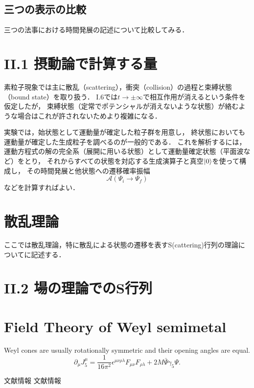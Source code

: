 \documentclass[uplatex]{jsarticle}
\numberwithin{theorem}{section}
\begin{document}
\subsection*{三つの表示の比較}
三つの法事における時間発展の記述について比較してみる．

\section*{II.1 摂動論で計算する量}
素粒子現象では主に散乱（scattering），衝突（collision）の過程と束縛状態（bound state）を取り扱う．
I.6では$t \to \pm \infty$で相互作用が消えるという条件を仮定したが，
束縛状態（定常でポテンシャルが消えないような状態）が絡むような場合はこれが許されないためより複雑になる．

実験では，始状態として運動量が確定した粒子群を用意し，
終状態においても運動量が確定した生成粒子を調べるのが一般的である．
これを解析するには，運動方程式の解の完全系（展開に用いる状態）として運動量確定状態（平面波など）をとり，
それからすべての状態を対応する生成演算子と真空$\ket{0}$を使って構成し，
その時間発展と他状態への遷移確率振幅
\begin{equation}
    \mathcal{A}(\Psi_i \to \Psi_f)
\end{equation}
などを計算すればよい．

\section*{散乱理論}
ここでは散乱理論，特に散乱による状態の遷移を表すS(cattering)行列の理論についてに記述する．


\section*{II.2 場の理論でのS行列}


\section*{Field Theory of Weyl semimetal}
Weyl cones are usually rotationally symmetric and their opening angles are equal.
\begin{equation}
    \partial_\mu J_5^\mu
    = \frac{1}{16\pi^2} \epsilon^{\mu\nu\rho\lambda} F_{\mu\nu} F_{\rho\lambda}
    + 2M \bar{\Psi}\gamma_5 \Psi.
\end{equation} %


\begin{thebibliography}{99}
 文献情報
 文献情報
\end{thebibliography}
\end{document}
